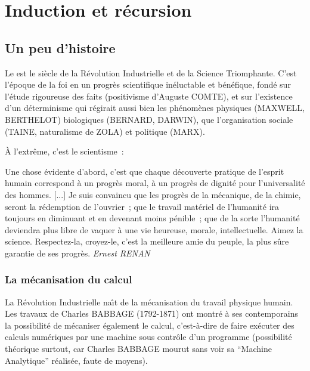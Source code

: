 \chapter{Induction et récursion}





\section{Un peu d'histoire}

Le  est le siècle de la Révolution Industrielle et de la
Science Triomphante. C'est l'époque de la foi en un progrès
scientifique inéluctable et bénéfique, fondé sur l'étude rigoureuse
des faits (positivisme d'Auguste COMTE), et sur l'existence d'un
déterminisme qui régirait aussi bien les phénomènes physiques
(MAXWELL, BERTHELOT) biologiques (BERNARD, DARWIN), que l'organisation
sociale (TAINE, naturalisme de ZOLA) et politique (MARX).

À l'extr\^eme, c'est le scientisme~:
\begin{citation}
Une chose évidente d'abord, c'est que chaque découverte pratique de
l'esprit humain correspond à un progrès moral, à un progrès de dignité
pour l'universalité des hommes. [...] Je suis convaincu que les
progrès de la mécanique, de la chimie, seront la rédemption de
l'ouvrier~; que le travail matériel de l'humanité ira toujours en
diminuant et en devenant moins pénible~; que de la sorte l'humanité
deviendra plus libre de vaquer à une vie heureuse, morale,
intellectuelle. Aimez la science. Respectez-la, croyez-le, c'est la
meilleure amie du peuple, la plus s\^ure garantie de ses progrès.
{\em Ernest RENAN }
\end{citation}


\subsection*{La mécanisation du calcul}

La Révolution Industrielle na\^{\i}t de la mécanisation du travail
physique humain. Les travaux de Charles BABBAGE (1792-1871) ont montré
à ses contemporains la possibilité de mécaniser également le calcul,
c'est-à-dire de faire exécuter des calculs numériques par une machine
sous contr\^ole d'un programme (possibilité théorique surtout, car
Charles BABBAGE mourut sans voir sa ``Machine Analytique'' réalisée,
faute de moyens).

